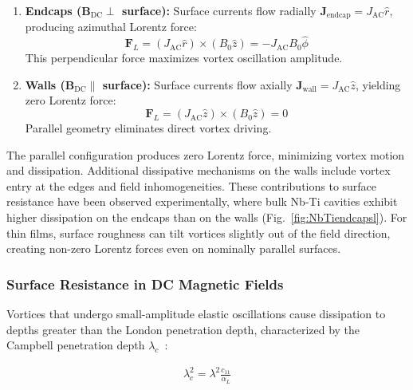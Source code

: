     \begin{enumerate}
        \item \textbf{Endcaps ($\mathbf{B}_{\text{DC}} \perp$ surface):} 
        Surface currents flow radially $\mathbf{J}_{\text{endcap}} = J_{\text{AC}} \hat{r}$, producing azimuthal Lorentz force:
        \begin{equation}
            \mathbf{F}_L = (J_{\text{AC}} \hat{r}) \times (B_0 \hat{z}) = -J_{\text{AC}} B_0 \hat{\phi}
        \end{equation}
        This perpendicular force maximizes vortex oscillation amplitude.
        
        \item \textbf{Walls ($\mathbf{B}_{\text{DC}} \parallel$ surface):} 
        Surface currents flow axially $\mathbf{J}_{\text{wall}} = J_{\text{AC}} \hat{z}$, yielding zero Lorentz force:
        \begin{equation}
            \mathbf{F}_L = (J_{\text{AC}} \hat{z}) \times (B_0 \hat{z}) = 0
        \end{equation}
        Parallel geometry eliminates direct vortex driving.
    \end{enumerate}
    
    The parallel configuration produces zero Lorentz force, minimizing vortex motion and dissipation. Additional dissipative mechanisms on the walls include vortex entry at the edges and field inhomogeneities. These contributions to surface resistance have been observed experimentally, where bulk Nb-Ti cavities exhibit higher dissipation on the endcaps than on the walls (Fig.~\ref{fig:NbTiendcapsl}). For thin films, surface roughness can tilt vortices slightly out of the field direction, creating non-zero Lorentz forces even on nominally parallel surfaces.
    
    \subsubsection{Surface Resistance in DC Magnetic Fields}
    
    Vortices that undergo small-amplitude elastic oscillations cause dissipation to depths greater than the London penetration depth, characterized by the Campbell penetration depth $\lambda_c$~\cite{campbellResponsePinnedFlux1969}:
    
    \begin{align}
       \lambda_c^2 = \lambda^2 \frac{c_{11}}{\alpha_L} \label{eq:lambdaprime}
    \end{align}  
    
